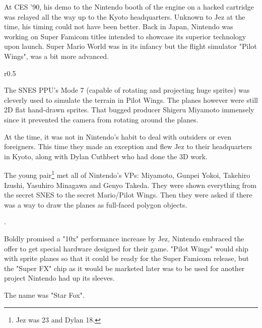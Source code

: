 At CES '90, his demo to the Nintendo booth of the engine on a hacked cartridge was relayed all the way up to the Kyoto headquarters. Unknown to Jez at the time, his timing could not have been better. Back in Japan, Nintendo was working on Super Famicom titles intended to showcase its superior technology upon launch. Super Mario World was in its infancy but the flight simulator "Pilot Wings", was a bit more advanced.\\ 
\par
\begin{wrapfigure}[14]{r}{0.5\textwidth}{
\centering {}}
\end{wrapfigure}
The SNES PPU's Mode 7 (capable of rotating and projecting huge sprites) was cleverly used to simulate the terrain in Pilot Wings. The planes however were still 2D flat hand-drawn sprites. That bugged producer Shigeru Miyamoto immensely since it prevented the camera from rotating around the planes.\\
\par
At the time, it was not in Nintendo's habit to deal with outsiders or even foreigners. This time they made an exception and flew Jez to their headquarters in Kyoto, along with Dylan Cuthbert who had done the 3D work.\\
\par
 The young pair\footnote{Jez was 23 and Dylan 18.} met all of Nintendo's VPs: Miyamoto, Gunpei Yokoi, Takehiro Izushi, Yasuhiro Minagawa and Genyo Takeda. They were shown everything from the secret SNES to the secret Mario/Pilot Wings. Then they were asked if there was a way to draw the planes as full-faced polygon objects.\\
\par
{}.\\
\par

Boldly promised a "10x" performance increase by Jez, Nintendo embraced the offer to get special hardware designed for their game. "Pilot Wings" would ship with sprite planes so that it could be ready for the Super Famicom release, but the "Super FX" chip as it would be marketed later was to be used for another project Nintendo had up its sleeves.\\
\par
The name was "Star Fox".

